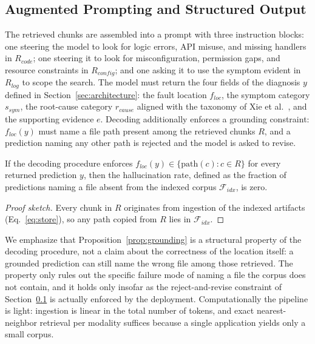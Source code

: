 \documentclass[runningheads]{llncs}
\begin{document}
\subsection{Augmented Prompting and Structured Output}
\label{sec:prompting}

The retrieved chunks are assembled into a prompt with three instruction blocks: one steering the model to look for logic errors, API misuse, and missing handlers in $R_{code}$; one steering it to look for misconfiguration, permission gaps, and resource constraints in $R_{config}$; and one asking it to use the symptom evident in $R_{log}$ to scope the search. The model must return the four fields of the diagnosis $y$ defined in Section~\ref{sec:architecture}: the fault location $f_{loc}$, the symptom category $s_{sym}$, the root-cause category $r_{cause}$ aligned with the taxonomy of Xie et al.~\cite{xie2025understanding}, and the supporting evidence $e$. Decoding additionally enforces a grounding constraint: $f_{loc}(y)$ must name a file path present among the retrieved chunks $R$, and a prediction naming any other path is rejected and the model is asked to revise.

\begin{proposition}
\label{prop:grounding}
If the decoding procedure enforces $f_{loc}(y) \in \{\text{path}(c) : c \in R\}$ for every returned prediction $y$, then the hallucination rate, defined as the fraction of predictions naming a file absent from the indexed corpus $\mathcal{F}_{idx}$, is zero.
\end{proposition}

\begin{proof}[Proof sketch]
Every chunk in $R$ originates from ingestion of the indexed artifacts (Eq.~\eqref{eq:store}), so any path copied from $R$ lies in $\mathcal{F}_{idx}$.
\end{proof}

We emphasize that Proposition~\ref{prop:grounding} is a structural property of the decoding procedure, not a claim about the correctness of the location itself: a grounded prediction can still name the wrong file among those retrieved. The property only rules out the specific failure mode of naming a file the corpus does not contain, and it holds only insofar as the reject-and-revise constraint of Section~\ref{sec:prompting} is actually enforced by the deployment. Computationally the pipeline is light: ingestion is linear in the total number of tokens, and exact nearest-neighbor retrieval per modality suffices because a single application yields only a small corpus.
\end{document}

